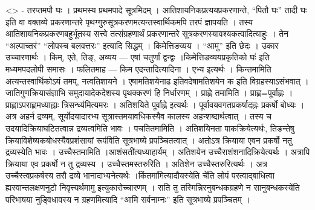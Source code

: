 \textless{}\textgreater{} - तरप्तमपौ घः । प्रथमस्य प्रथमपादे सूत्रमिदम्
। आतिशायनिकप्रत्ययप्रकरणान्ते, ``पितौ घः'' तादी घः इति वा वक्तव्ये
प्रकरणान्तरे पृथग्गुरुसूत्रकरणमत्यन्तस्वार्थिकमपि तरपं ज्ञापयति । तस्य
आतिशायनिकप्रकरणबहुर्भूतस्य सत्त्वे तत्संग्रहणार्थं प्रकरणान्तरे
सूत्रकरणस्यावश्यकत्वादित्याहुः । तेन ``अल्पाच्तरं'' ``लोपस्च बलवत्तरः''
इत्यादि सिद्धम् । किमेत्तिङव्यय । ``आमु'' इति छेदः । उकार उच्चारणार्थः ।
किम्, एते, तिङ्, अव्यय --- एषां चतुर्णां द्वन्द्वः
।किमेत्तिङव्ययप्रकृतिको घः॑ इति मध्यमपदलोपी समासः । फलितमाह --- किम
एदन्तादित्यादिना । एभ्य इत्यर्थः । किन्तमामिति अत्यन्तस्वार्थिकोऽयं
तमप्, नत्वतिशायने । एषामतिशयेनाढ इतिवदेषामतिशयेन क इति
विग्रहस्याऽसंभवात् । जातिगुणक्रियासंज्ञाभि समुदायादेकदेशस्य पृथक्करणं हि
निर्धारणम् । प्राह्णे तमामिति । प्राह्ण=पूर्वाह्णः
।प्राह्णाऽपराह्णमध्याह्नाः त्रिसन्ध्य॑मित्यमरः । अतिशयिते पूर्वाह्णे
इत्यर्थः । पूर्वावयवगतप्रकर्षादह्नः प्रकर्षो बोध्यः । अत्र अहर्न
द्रव्यम्, सूर्योदयादारभ्य सूत्रास्तमयावधिकस्यैव कालस्य
अहन्शब्दार्थत्वात् । तस्य च उदयादिक्रियाघटितत्वान्न द्रव्यत्वमिति भावः ।
पचतितमामिति । अतिशयिनता पाकक्रियेत्यर्थः, तिङन्तेषु
क्रियाविशेष्यकबोधस्यैवप्रशंसायां रूप॑विति सूत्रभाष्ये प्रपञ्चितत्वात् ।
अतोऽत्र क्रियाया एवन प्रकर्षो नतु द्रव्यस्येति भावः । उच्चैस्तमामिति
।आशंसती॑त्यध्याहार्यम् । अतिशयेन उच्चैराशंशनादिक्रियेत्यर्थः । अत्रापि
क्रियाया एव प्रकर्षो न तु द्रव्यस्य । उच्चैस्तमस्तरुरिति । अतिशेन
उच्चैस्तरुरित्यर्थः । अत्र उच्चैस्त्वप्रकर्षस्य तरौ द्रव्ये
भानादाभ्यनेत्यर्थः ।किंतमा॑मित्यादौयस्येति चे॑ति लोपं परत्वाद्बाधित्वा
ह्यस्वान्तलक्षणनुटो निवृत्त्यर्थमामु इत्युकारोच्चारणम् । सति तु
तस्मिन्निरनुबन्धकग्रहणे न सानुबन्धकस्ये॑ति परिभाषया नुड्विधावस्य न
ग्रहणमित्यादि ``आमि सर्वनाम्नः'' इति सूत्रभाष्ये प्रपञ्चितम् ।
